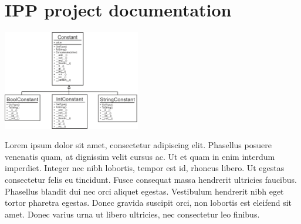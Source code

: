 \documentclass[10pt,a4paper,titlepage]{article}
\begin{document}

\setcounter{page}{1}

\section{IPP project documentation}

\begin{multicols}{2}
\includegraphics[width=0.45\textwidth]{interpret_constant.png}

\begin{justify}
Lorem ipsum dolor sit amet, consectetur adipiscing elit. Phasellus posuere venenatis quam,
at dignissim velit cursus ac. Ut et quam in enim interdum imperdiet. Integer nec nibh lobortis,
tempor est id, rhoncus libero. Ut egestas consectetur felis eu tincidunt. Fusce consequat massa
hendrerit ultricies faucibus. Phasellus blandit dui nec orci aliquet egestas. Vestibulum hendrerit
nibh eget tortor pharetra egestas. Donec gravida suscipit orci, non lobortis est eleifend sit amet.
Donec varius urna ut libero ultricies, nec consectetur leo finibus.
\end{justify}

\end{multicols}
\end{document}
